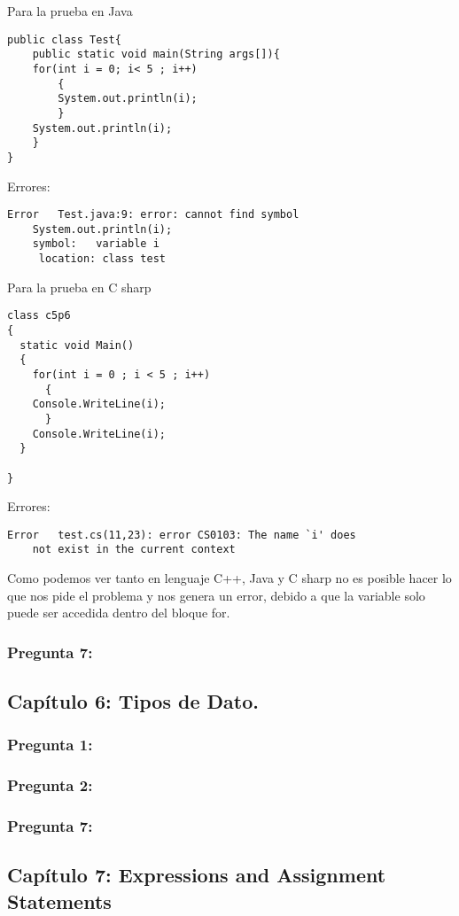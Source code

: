\documentclass[11pt]{article}
\begin{document}
Para la prueba en Java
\begin{lstlisting}[frame=single]
public class Test{
    public static void main(String args[]){
	for(int i = 0; i< 5 ; i++)
	    {
		System.out.println(i);
	    }
	System.out.println(i);
    }
}
\end{lstlisting}
\noindent Errores:
\begin{verbatim}
Error	Test.java:9: error: cannot find symbol
	System.out.println(i);
	symbol:   variable i
	 location: class test
\end{verbatim}

Para la prueba en C sharp

\begin{lstlisting}[frame=single]
class c5p6
{
  static void Main()
  {
    for(int i = 0 ; i < 5 ; i++)
      {
	Console.WriteLine(i);
      }
    Console.WriteLine(i); 
  }

}
\end{lstlisting}
\noindent Errores:
\begin{verbatim}
Error	test.cs(11,23): error CS0103: The name `i' does 
	not exist in the current context
\end{verbatim}
Como podemos ver tanto en lenguaje C++, Java y C sharp no es posible hacer lo que nos pide el problema y nos genera un error, debido a que la variable solo puede ser accedida dentro del bloque for.

\subsubsection{Pregunta 7:}

\subsection{Capítulo 6: Tipos de Dato.}
\subsubsection{Pregunta 1:}

\subsubsection{Pregunta 2:}

\subsubsection{Pregunta 7:}

\subsection{Capítulo 7: Expressions and Assignment Statements}
\end{document}
